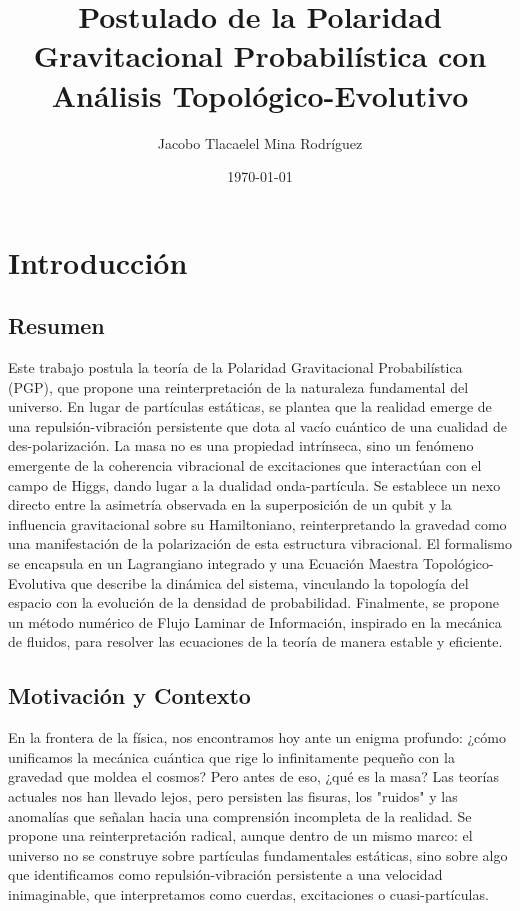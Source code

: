 \documentclass{book} %
\begin{document}
\frontmatter
\title{Postulado de la Polaridad Gravitacional Probabilística con Análisis Topológico-Evolutivo}
\author{Jacobo Tlacaelel Mina Rodríguez}
\date{\today}
\maketitle

\tableofcontents

\mainmatter

\chapter{Introducción}

\section*{Resumen}
Este trabajo postula la teoría de la Polaridad Gravitacional Probabilística (PGP), que propone una reinterpretación de la naturaleza fundamental del universo. En lugar de partículas estáticas, se plantea que la realidad emerge de una repulsión-vibración persistente que dota al vacío cuántico de una cualidad de des-polarización. La masa no es una propiedad intrínseca, sino un fenómeno emergente de la coherencia vibracional de excitaciones que interactúan con el campo de Higgs, dando lugar a la dualidad onda-partícula. Se establece un nexo directo entre la asimetría observada en la superposición de un qubit y la influencia gravitacional sobre su Hamiltoniano, reinterpretando la gravedad como una manifestación de la polarización de esta estructura vibracional. El formalismo se encapsula en un Lagrangiano integrado y una Ecuación Maestra Topológico-Evolutiva que describe la dinámica del sistema, vinculando la topología del espacio con la evolución de la densidad de probabilidad. Finalmente, se propone un método numérico de Flujo Laminar de Información, inspirado en la mecánica de fluidos, para resolver las ecuaciones de la teoría de manera estable y eficiente.

\section{Motivación y Contexto}
En la frontera de la física, nos encontramos hoy ante un enigma profundo: ¿cómo unificamos la mecánica cuántica que rige lo infinitamente pequeño con la gravedad que moldea el cosmos? Pero antes de eso, ¿qué es la masa? Las teorías actuales nos han llevado lejos, pero persisten las fisuras, los "ruidos" y las anomalías que señalan hacia una comprensión incompleta de la realidad. Se propone una reinterpretación radical, aunque dentro de un mismo marco: el universo no se construye sobre partículas fundamentales estáticas, sino sobre algo que identificamos como repulsión-vibración persistente a una velocidad inimaginable, que interpretamos como cuerdas, excitaciones o cuasi-partículas.
\end{document}
